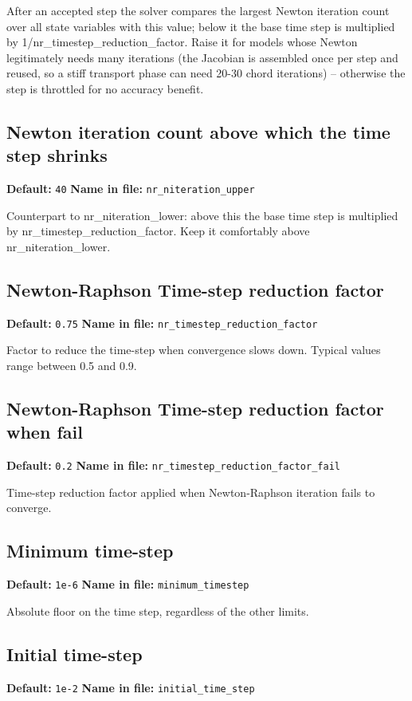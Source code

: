 \documentclass[11pt]{article}
\begin{document}
After an accepted step the solver compares the largest Newton iteration count over all state variables with this value; below it the base time step is multiplied by 1/nr\_timestep\_reduction\_factor. Raise it for models whose Newton legitimately needs many iterations (the Jacobian is assembled once per step and reused, so a stiff transport phase can need 20-30 chord iterations) -- otherwise the step is throttled for no accuracy benefit.
\subsection{Newton iteration count above which the time step shrinks}
{\small \textbf{Default:} \texttt{40} \quad\textbullet\quad \textbf{Name in file:} \texttt{nr\_\allowbreak{}niteration\_\allowbreak{}upper}}

Counterpart to nr\_niteration\_lower: above this the base time step is multiplied by nr\_timestep\_reduction\_factor. Keep it comfortably above nr\_niteration\_lower.
\subsection{Newton-Raphson Time-step reduction factor}
{\small \textbf{Default:} \texttt{0.\allowbreak{}75} \quad\textbullet\quad \textbf{Name in file:} \texttt{nr\_\allowbreak{}timestep\_\allowbreak{}reduction\_\allowbreak{}factor}}

Factor to reduce the time-step when convergence slows down. Typical values range between 0.5 and 0.9.
\subsection{Newton-Raphson Time-step reduction factor when fail}
{\small \textbf{Default:} \texttt{0.\allowbreak{}2} \quad\textbullet\quad \textbf{Name in file:} \texttt{nr\_\allowbreak{}timestep\_\allowbreak{}reduction\_\allowbreak{}factor\_\allowbreak{}fail}}

Time-step reduction factor applied when Newton-Raphson iteration fails to converge.
\subsection{Minimum time-step}
{\small \textbf{Default:} \texttt{1e-6} \quad\textbullet\quad \textbf{Name in file:} \texttt{minimum\_\allowbreak{}timestep}}

Absolute floor on the time step, regardless of the other limits.
\subsection{Initial time-step}
{\small \textbf{Default:} \texttt{1e-2} \quad\textbullet\quad \textbf{Name in file:} \texttt{initial\_\allowbreak{}time\_\allowbreak{}step}}
\end{document}
